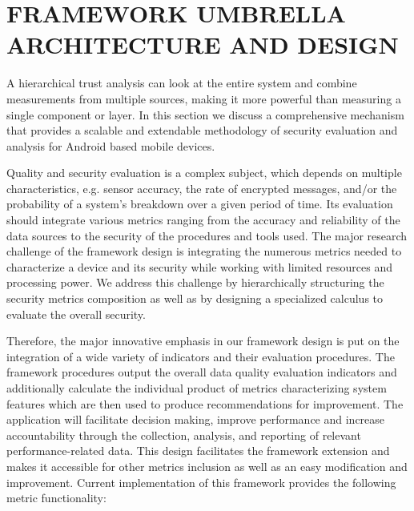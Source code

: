 \section{FRAMEWORK UMBRELLA ARCHITECTURE AND DESIGN}

A hierarchical trust analysis can look at the entire system and combine measurements from multiple sources, making
it more powerful than measuring a single component or layer.
In this section we discuss a comprehensive mechanism that provides a scalable and extendable methodology of security evaluation and analysis for Android based mobile devices. 

Quality and security evaluation is a complex subject, which depends on multiple characteristics, e.g. sensor accuracy, the rate of encrypted messages, and/or the probability of a system's breakdown over a given period of time. Its evaluation should integrate various metrics ranging from the accuracy and reliability of the data sources to the security of the procedures and tools used. The major research challenge of the framework design is integrating the numerous metrics needed to characterize a device and its security while working with limited resources and processing power. We address this challenge by hierarchically structuring the security metrics composition as well as by designing a specialized calculus to evaluate the overall security. 

Therefore, the major innovative emphasis in our framework design is put on the integration of a wide variety of indicators and their evaluation procedures. The framework procedures output the overall data quality evaluation indicators and additionally calculate the individual product of metrics characterizing system features which are then used to produce recommendations for improvement. The application will facilitate decision making, improve performance and increase accountability through the collection, analysis, and reporting of relevant performance-related data. This design facilitates the framework extension and makes it accessible for other metrics inclusion as well as an easy modification and improvement.
Current implementation of this framework provides the following metric functionality: 


